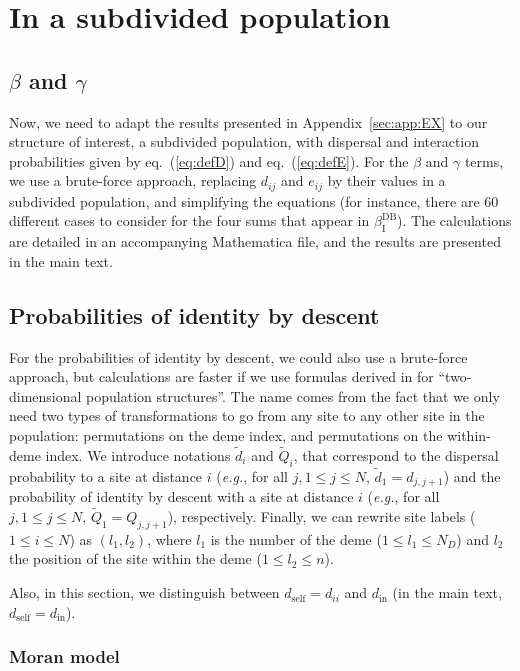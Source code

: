 \documentclass[11pt, letterpaper]{article}
\renewcommand{\eqref}[1]{\textup{{\normalfont eq.~(\ref{#1}}\normalfont)}}
\newcommand{\eg}{\textit{e.g.}}
\newcommand{\appname}[0]{Appendix}
\newcommand{\indirect}{\mathrm{I}}
\newcommand{\DB}{\textrm{DB}}
\newcommand{\din}{d_{\textrm{in}}}
\newcommand{\dself}{d_{\textrm{self}}}
\newcommand{\ndemes}{N_D}
\begin{document}
\clearpage
\section{In a subdivided population}

\subsection{$\beta$ and $\gamma$}
Now, we need to adapt the results presented in \appname~\ref{sec:app:EX} to our structure of interest, a subdivided population, with dispersal and interaction probabilities given by \eqref{eq:defD} and \eqref{eq:defE}. For the $\beta$ and $\gamma$ terms, we use a brute-force approach, replacing $d_{ij}$ and $e_{ij}$ by their values in a subdivided population, and simplifying the equations (for instance, there are $60$ different cases to consider for the four sums that appear in $\beta_{\indirect}^{\DB}$). The calculations are detailed in an accompanying Mathematica file, and the results are presented in the main text. 

\subsection{Probabilities of identity by descent}
For the probabilities of identity by descent, we could also use a brute-force approach, but calculations are faster if we use formulas derived in \citet{Debarre2017} for ``two-dimensional population structures''. The name comes from the fact that we only need two types of transformations to go from any site to any other site in the population: permutations on the deme index, and permutations on the within-deme index.  We introduce notations $\tilde{d}_i$ and $\tilde{Q}_i$, that correspond to the dispersal probability to a site at distance $i$ (\eg, for all $j, 1\leq j\leq N$, $\tilde{d}_1 = d_{j,j+1}$) and the probability of identity by descent with a site at distance $i$ (\eg, for all $j, 1\leq j\leq N$, $\tilde{Q}_1 = Q_{j,j+1}$), respectively. Finally, we can rewrite site labels ($1\leq i \leq N$) as $(l_1, l_2)$, where $l_1$ is the number of the deme ($1\leq l_1 \leq \ndemes$) and $l_2$ the position of the site within the deme ($1\leq l_2 \leq n$).

Also, in this section, we distinguish between $\dself = d_{ii}$ and $\din$ (in the main text, $\dself = \din$). 

\subsubsection{Moran model}
\end{document}
